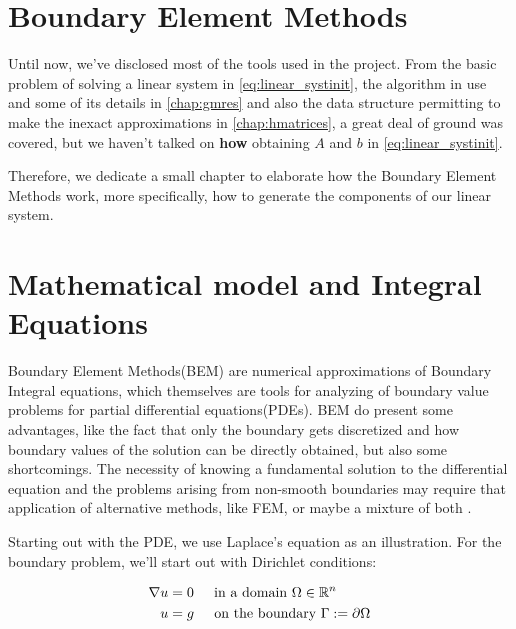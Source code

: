 \section{Boundary Element Methods}

Until now, we've disclosed most of the tools used in the project. From the basic problem of solving a linear system in \ref{eq:linear_systinit}, the algorithm in use and some of its details in \autoref{chap:gmres} and also the data structure permitting to make the inexact approximations in \autoref{chap:hmatrices}, a great deal of ground was covered, but we haven't talked on \textbf{how} obtaining $A$ and $b$ in \ref{eq:linear_systinit}.

Therefore, we dedicate a small chapter to elaborate how the Boundary Element Methods work, more specifically, how to generate the components of our linear system.

\section{Mathematical model and Integral Equations}

Boundary Element Methods(BEM) are numerical approximations of Boundary Integral equations, which themselves are tools for analyzing of boundary value problems for partial differential equations(PDEs). BEM do present some advantages, like the fact that only the boundary gets discretized and how boundary values of the solution can be directly obtained, but also some shortcomings. The necessity of knowing a fundamental solution to the differential equation and the problems arising from non-smooth boundaries may require that application of alternative methods, like FEM, or maybe a mixture of both \cite{costabel1987principles}.

Starting out with the PDE, we use Laplace's equation as an illustration. For the boundary problem, we'll start out with Dirichlet conditions:



\begin{align}\label{eq:pde_model}
    \begin{split}
        \nabla u &= 0 \hspace{0.2in} \text{in a domain } \Omega \in \mathbb{R}^{n}\\
        u &= g \hspace{0.2in} \text{on the boundary } \Gamma := \partial \Omega
    \end{split}
\end{align}

